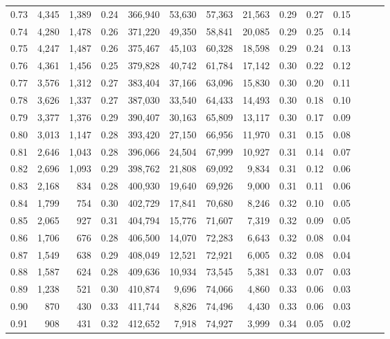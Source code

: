 \begin{tabular}{rrrrrrrrrrrrrr}
0.73 &  4,345 &  1,389 &  0.24 &  366,940 &   53,630 &  57,363 &  21,563 &  0.29 &  0.27 &      0.15 \\
0.74 &  4,280 &  1,478 &  0.26 &  371,220 &   49,350 &  58,841 &  20,085 &  0.29 &  0.25 &      0.14 \\
0.75 &  4,247 &  1,487 &  0.26 &  375,467 &   45,103 &  60,328 &  18,598 &  0.29 &  0.24 &      0.13 \\
0.76 &  4,361 &  1,456 &  0.25 &  379,828 &   40,742 &  61,784 &  17,142 &  0.30 &  0.22 &      0.12 \\
0.77 &  3,576 &  1,312 &  0.27 &  383,404 &   37,166 &  63,096 &  15,830 &  0.30 &  0.20 &      0.11 \\
0.78 &  3,626 &  1,337 &  0.27 &  387,030 &   33,540 &  64,433 &  14,493 &  0.30 &  0.18 &      0.10 \\
0.79 &  3,377 &  1,376 &  0.29 &  390,407 &   30,163 &  65,809 &  13,117 &  0.30 &  0.17 &      0.09 \\
0.80 &  3,013 &  1,147 &  0.28 &  393,420 &   27,150 &  66,956 &  11,970 &  0.31 &  0.15 &      0.08 \\
0.81 &  2,646 &  1,043 &  0.28 &  396,066 &   24,504 &  67,999 &  10,927 &  0.31 &  0.14 &      0.07 \\
0.82 &  2,696 &  1,093 &  0.29 &  398,762 &   21,808 &  69,092 &   9,834 &  0.31 &  0.12 &      0.06 \\
0.83 &  2,168 &    834 &  0.28 &  400,930 &   19,640 &  69,926 &   9,000 &  0.31 &  0.11 &      0.06 \\
0.84 &  1,799 &    754 &  0.30 &  402,729 &   17,841 &  70,680 &   8,246 &  0.32 &  0.10 &      0.05 \\
0.85 &  2,065 &    927 &  0.31 &  404,794 &   15,776 &  71,607 &   7,319 &  0.32 &  0.09 &      0.05 \\
0.86 &  1,706 &    676 &  0.28 &  406,500 &   14,070 &  72,283 &   6,643 &  0.32 &  0.08 &      0.04 \\
0.87 &  1,549 &    638 &  0.29 &  408,049 &   12,521 &  72,921 &   6,005 &  0.32 &  0.08 &      0.04 \\
0.88 &  1,587 &    624 &  0.28 &  409,636 &   10,934 &  73,545 &   5,381 &  0.33 &  0.07 &      0.03 \\
0.89 &  1,238 &    521 &  0.30 &  410,874 &    9,696 &  74,066 &   4,860 &  0.33 &  0.06 &      0.03 \\
0.90 &    870 &    430 &  0.33 &  411,744 &    8,826 &  74,496 &   4,430 &  0.33 &  0.06 &      0.03 \\
0.91 &    908 &    431 &  0.32 &  412,652 &    7,918 &  74,927 &   3,999 &  0.34 &  0.05 &      0.02 \\

\end{tabular}
